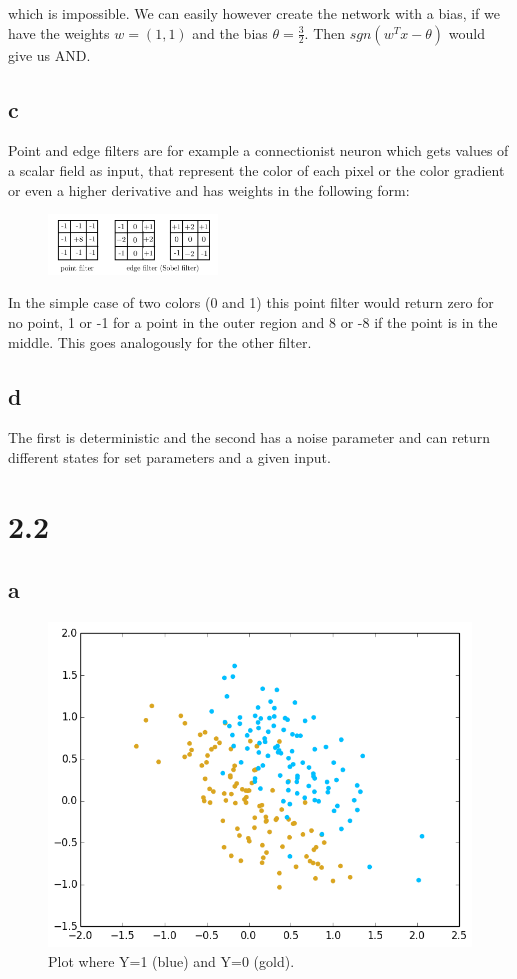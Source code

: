 \documentclass[11pt,a4paper]{article}
\begin{document}
which is impossible. We can easily however create the network with a bias, if we have the weights $w = (1, 1)$ and the bias
$\theta = \frac{3}{2}$. Then $sgn(w^Tx - \theta)$ would give us AND.
\subsection*{c}
Point and edge filters are for example a connectionist neuron which gets values of a scalar field as input, that
represent the color of each pixel or the color gradient or even a higher derivative and has weights in the following form:
\begin{figure}[h]
\centering
 \includegraphics[width=0.4\textwidth]{./point_edge.png}
\end{figure}
In the simple case of two colors (0 and 1) this point filter would return zero for no point, 1 or -1 for a point in the outer
region and 8 or -8 if the point is in the middle. This goes analogously for the other filter.
\subsection*{d}
The first is deterministic and the second has a noise parameter and can return different states for set parameters and a given
input.


\section*{2.2}
\subsection*{a}
\begin{figure}[h]
\centering
 \includegraphics[width=\textwidth]{./2_2_a.png}
\caption{Plot where Y=1 (blue) and Y=0 (gold).}
\end{figure}
\end{document}
